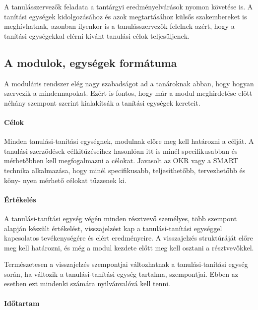 A tanulásszervezők feladata a tantárgyi eredményelvárások nyomon
követése is. A tanítási egységek kidolgozásához és azok megtartásához
külsős szakembereket is meghívhatnak, azonban ilyenkor is a
tanulásszervezők felelnek azért, hogy a tanítási egységekkal elérni
kívánt tanulási célok teljesüljenek.

\hypertarget{a-modulok-egysegek-formatuma}{%
\subsection{A modulok, egységek
formátuma}\label{a-modulok-egysegek-formatuma}}

A moduláris rendszer elég nagy szabadságot ad a tanároknak abban, hogy
hogyan szervezik a mindennapokat. Ezért is fontos, hogy már a modul
meghirdetése előtt néhány szempont szerint kialakítsák a tanítási
egységek kereteit.

\hypertarget{celok}{%
\paragraph{Célok}\label{celok}}

Minden tanulási-tanítási egységnek, modulnak előre meg kell határozni a
célját. A tanulási szerződések célkitűzéseihez hasonlóan itt is minél
specifikusabban és mérhetőbben kell megfogalmazni a célokat. Javasolt az
OKR {\autocite{Doerr2018}} vagy a SMART {\autocite{Doran1981}} technika
alkalmazása, hogy minél specifikusabb, teljesíthetőbb, tervezhetőbb és
köny-\break
nyen mérhető célokat tűzzenek ki.

\hypertarget{ertekeles}{%
\paragraph{Értékelés}\label{ertekeles}}

A tanulási-tanítási egység végén minden résztvevő személyes, több
szempont alapján készült értékelést, visszajelzést kap a
tanulási-ta\-ní\-tá\-si egységgel kapcsolatos tevékenységére és elért
eredményeire. A visszajelzés struktúráját előre meg kell határozni, és
még a modul kezdete előtt meg kell osztani a résztvevőkkel.

Természetesen a visszajelzés szempontjai változhatnak a
tanulási-ta\-ní\-tá\-si egység során, ha változik a tanulási-tanítási egység
tartalma, szempontjai. Ebben az esetben ezt mindenki számára nyilvánvalóvá
kell tenni.

\hypertarget{idotartam}{%
\paragraph{Időtartam}\label{idotartam}}

